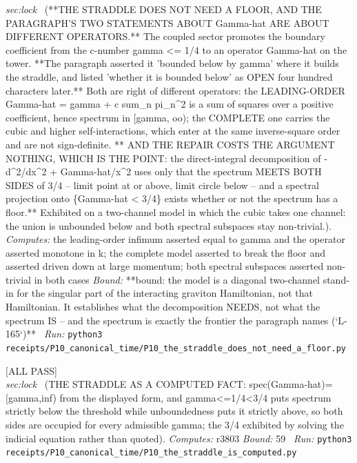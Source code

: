 \begin{description}
\textit{sec:lock} \ (**THE STRADDLE DOES NOT NEED A FLOOR, AND THE PARAGRAPH'S TWO STATEMENTS ABOUT Gamma-hat ARE ABOUT DIFFERENT OPERATORS.** The coupled sector promotes the boundary coefficient from the c-number gamma <= 1/4 to an operator Gamma-hat on the tower. **The paragraph asserted it 'bounded below by gamma' where it builds the straddle, and listed 'whether it is bounded below' as OPEN four hundred characters later.** Both are right of different operators: the LEADING-ORDER Gamma-hat = gamma + c sum\_n pi\_n\textasciicircum{}2 is a sum of squares over a positive coefficient, hence spectrum in [gamma, oo); the COMPLETE one carries the cubic and higher self-interactions, which enter at the same inverse-square order and are not sign-definite. ** AND THE REPAIR COSTS THE ARGUMENT NOTHING, WHICH IS THE POINT: the direct-integral decomposition of -d\textasciicircum{}2/dx\textasciicircum{}2 + Gamma-hat/x\textasciicircum{}2 uses only that the spectrum MEETS BOTH SIDES of 3/4 -- limit point at or above, limit circle below -- and a spectral projection onto \{Gamma-hat < 3/4\} exists whether or not the spectrum has a floor.** Exhibited on a two-channel model in which the cubic takes one channel: the union is unbounded below and both spectral subspaces stay non-trivial.). 
\emph{Computes:} the leading-order infimum asserted equal to gamma and the operator asserted monotone in k; the complete model asserted to break the floor and asserted driven down at large momentum; both spectral subspaces asserted non-trivial in both cases
 \emph{Bound:} **bound: the model is a diagonal two-channel stand-in for the singular part of the interacting graviton Hamiltonian, not that Hamiltonian. It establishes what the decomposition NEEDS, not what the spectrum IS -- and the spectrum is exactly the frontier the paragraph names (`L-165`)**
\ \emph{Run:} \texttt{python3 receipts/P10\_canonical\_time/P10\_the\_straddle\_does\_not\_need\_a\_floor.py}
\item[\label{rcpt:P10_the_straddle_is_computed}\texttt{P10\_the\_straddle\_is\_computed}]\hfill\textsf{[ALL PASS]}\\
\textit{sec:lock} \ (THE STRADDLE AS A COMPUTED FACT: spec(Gamma-hat)=[gamma,inf) from the displayed form, and gamma<=1/4<3/4 puts spectrum strictly below the threshold while unboundedness puts it strictly above, so both sides are occupied for every admissible gamma; the 3/4 exhibited by solving the indicial equation rather than quoted). 
\emph{Computes:} r3803
 \emph{Bound:} 59
\ \emph{Run:} \texttt{python3 receipts/P10\_canonical\_time/P10\_the\_straddle\_is\_computed.py}

\end{description}
